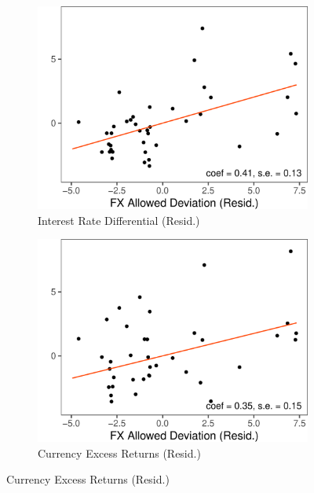 \documentclass[12pt,letter]{article}
\theoremstyle{break} \theorembodyfont{\normalfont\itshape}
\theoremstyle{break}
\theoremstyle{break} \theorembodyfont{\normalfont\itshape}
\theoremstyle{break} \theorembodyfont{\normalfont\itshape}
\begin{document}
\begin{figure}
  \begin{minipage}{\linewidth}
    \caption{Interest Rate Differentials, Capital Intensity, and
      Exchange Rate Regimes \label{fig_stylized}}
    \label{fig_intro}
    \begin{subfigure}{.33\textwidth}
      \centering
      \caption{Interest Rate Differential (Resid.)}
      \includegraphics[width=\textwidth]{./Figures/Figure_FP_ERA.pdf}
    \end{subfigure}
    \begin{subfigure}{.33\textwidth}
      \centering
      \caption{Currency Excess Returns (Resid.)}
      \includegraphics[width=\textwidth]{./Figures/Figure_RX_ERA.pdf}

\end{subfigure}
\end{minipage}
\end{figure}
\end{document}
